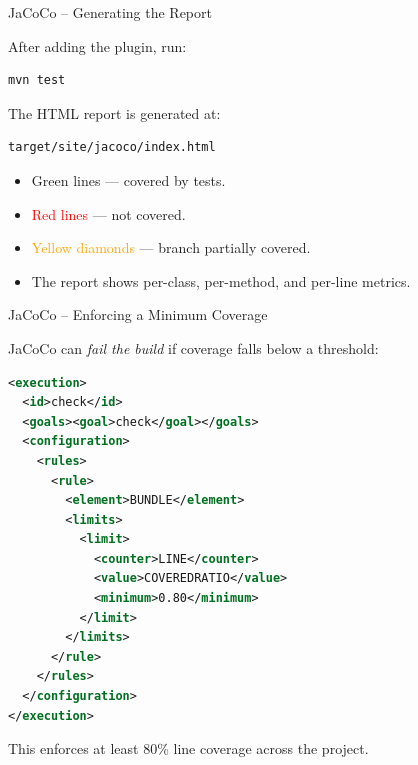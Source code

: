 \documentclass[11pt, xcolor=svgnames]{beamer}
\begin{document}
\begin{frame}[fragile]{JaCoCo -- Generating the Report}

After adding the plugin, run:

\begin{lstlisting}[language={}]
mvn test
\end{lstlisting}

The HTML report is generated at:

\begin{lstlisting}[language={}]
target/site/jacoco/index.html
\end{lstlisting}

\begin{itemize}
  \item \textcolor{green!60!black}{Green lines} --- covered by tests.
  \item \textcolor{red}{Red lines} --- not covered.
  \item \textcolor{orange}{Yellow diamonds} --- branch partially covered.
  \item The report shows per-class, per-method, and per-line metrics.
\end{itemize}

\end{frame}


\begin{frame}[fragile]{JaCoCo -- Enforcing a Minimum Coverage}

JaCoCo can \emph{fail the build} if coverage falls below a threshold:

\begin{lstlisting}[language=XML,basicstyle=\tiny]
<execution>
  <id>check</id>
  <goals><goal>check</goal></goals>
  <configuration>
    <rules>
      <rule>
        <element>BUNDLE</element>
        <limits>
          <limit>
            <counter>LINE</counter>
            <value>COVEREDRATIO</value>
            <minimum>0.80</minimum>
          </limit>
        </limits>
      </rule>
    </rules>
  </configuration>
</execution>
\end{lstlisting}

This enforces at least 80\% line coverage across the project.

\end{frame}


\end{document}

